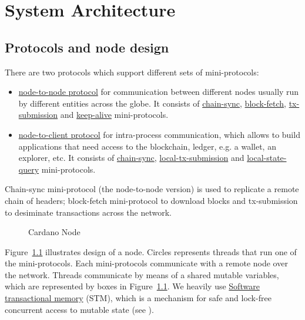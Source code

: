 \chapter{System Architecture}

\section{Protocols and node design}
There are two protocols which support different sets of mini-protocols:
\begin{itemize}
  \item\hyperref[section:node-to-node-protocol]{node-to-node protocol}
    for communication between different nodes usually run by different
    entities across the globe.  It consists of
    \hyperref[chain-sync-protocol]{chain-sync},
    \hyperref[block-fetch-protocol]{block-fetch},
    \hyperref[tx-submission-protocol]{tx-submission} and
    \hyperref[keep-alive-protocol]{keep-alive} mini-protocols.
  \item\hyperref[section:node-to-client-protocol]{node-to-client
    protocol} for intra-process communication, which allows to build
    applications that need access to the blockchain, ledger, e.g. a wallet, an
    explorer, etc.  It consists of \hyperref[chain-sync-protocol]{chain-sync},
    \hyperref[local-tx-submission-protocol]{local-tx-submission} and
    \hyperref[local-state-query-protocol]{local-state-query} mini-protocols.
\end{itemize}

Chain-sync mini-protocol (the node-to-node version) is used to replicate
a remote chain of headers; block-fetch mini-protocol to download blocks and
tx-submission to desiminate transactions across the network.

\begin{figure}
  \begin{center}
  \end{center}
  \caption{Cardano Node}
  \label{node-diagram-concurrency}
\end{figure}

Figure~\ref{node-diagram-concurrency} illustrates design of a node.  Circles
represents threads that run one of the mini-protocols.
Each mini-protocols communicate with a remote node over the network.
Threads communicate by means of a shared mutable variables, which
are represented by boxes in Figure~\ref{node-diagram-concurrency}.
We heavily use
\href{https://en.wikipedia.org/wiki/Software_transactional_memory}{Software
transactional memory} (STM), which is a mechanism for safe and lock-free
concurrent access to mutable state (see \cite{stm:harris2006}).

